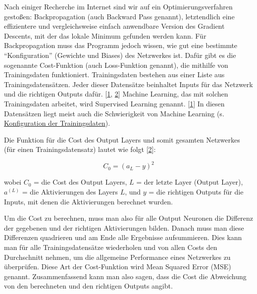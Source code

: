 \documentclass[11pt, a4paper, ngerman]{article}
\begin{document}
		Nach einiger Recherche im Internet sind wir auf ein Optimierungsverfahren gestoßen: Backpropagation (auch Backward Pass genannt), letztendlich eine effizientere und vergleichsweise einfach anwendbare Version des Gradient Descents, mit der das lokale Minimum gefunden werden kann. Für Backpropagation muss das Programm jedoch wissen, wie gut eine bestimmte “Konfiguration” (Gewichte und Biases) des Netzwerkes ist. Dafür gibt es die sogenannte Cost-Funktion (auch Loss-Funktion genannt), die mithilfe von Trainingsdaten funktioniert. Trainingsdaten bestehen aus einer Liste aus Trainingsdatensätzen. Jeder dieser Datensätze beinhaltet Inputs für das Netzwerk und die richtigen Outputs dafür. [\hyperref[src:1]{1}, \hyperref[src:2]{2}] Machine Learning, das mit solchen Trainingsdaten arbeitet, wird Supervised Learning genannt. [\hyperref[src:1]{1}] In diesen Datensätzen liegt meist auch die Schwierigkeit von Machine Learning (s. \hyperref[Vorgehensweise]{Konfiguration der Trainingsdaten}).
		
		Die Funktion für die Cost des Output Layers und somit gesamten Netzwerkes (für einen Trainingsdatensatz) lautet wie folgt [\hyperref[src:2]{2}]:
		
		{\Large \[C_{0} = \left(a_{L} - y \right)^{2} \]}
		
		\noindent wobei $C_0$ = die Cost des Output Layers, $L$ = der letzte Layer (Output Layer), $a^{(L)}$ =  die Aktivierungen des Layers $L$, und $y$ = die richtigen Outputs für die Inputs, mit denen die Aktivierungen berechnet wurden.
		
		Um die Cost zu berechnen, muss man also für alle Output Neuronen die Differenz der gegebenen und der richtigen Aktivierungen bilden. Danach muss man diese Differenzen quadrieren und am Ende alle Ergebnisse aufsummieren. Dies kann man für alle Trainingsdatensätze wiederholen und von allen Costs den Durchschnitt nehmen, um die allgemeine Performance eines Netzwerkes zu überprüfen. Diese Art der Cost-Funktion wird Mean Squared Error (MSE) genannt. Zusammenfassend kann man also sagen, dass die Cost die Abweichung von den berechneten und den richtigen Outputs angibt.
		
\end{document}
